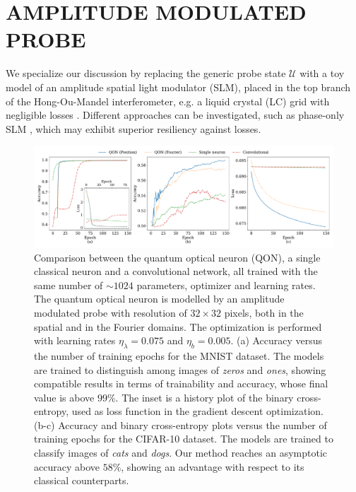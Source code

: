 \documentclass[reprint,
superscriptaddress,
nofootinbib,
aps,
pra,
showkeys
]{revtex4-2}
\newcommand{\U}{\mathcal{U}}
\begin{document}
\section{AMPLITUDE MODULATED PROBE\label{sec:SecIII}}
We specialize our discussion by replacing the generic probe state $\U$ with a toy model of an amplitude spatial light modulator (SLM), placed in the top branch of the Hong-Ou-Mandel interferometer, e.g. a liquid crystal (LC) grid with negligible losses \citep{art:Neff}. Different approaches can be investigated, such as phase-only SLM \citep{art:Zhang}, which may exhibit superior resiliency against losses.
\begin{figure}
	\centering
	\includegraphics[width = 1 \textwidth]{Comparison.pdf}%
	\caption{\label{fig:Training}Comparison between the quantum optical neuron (QON), a single classical neuron and a convolutional network, all trained with the same number of $\sim 1024$ parameters, optimizer and learning rates. The quantum optical neuron is modelled by an amplitude modulated probe with resolution of $32 \times 32$ pixels, both in the spatial and in the Fourier domains. The optimization is performed with learning rates $\eta_\lambda = 0.075$ and $\eta_b = 0.005$. (a) Accuracy versus the number of training epochs for the MNIST dataset. The models are trained to distinguish among images of \emph{zeros} and \emph{ones}, showing compatible results in terms of trainability and accuracy,  whose final value is above $99\%$. The inset is a history plot of the binary cross-entropy, used as loss function in the gradient descent optimization. (b-c) Accuracy and binary cross-entropy plots versus the number of training epochs for the CIFAR-10 dataset. The models are trained to classify images of \emph{cats} and \emph{dogs}. Our method reaches an asymptotic accuracy above $58\%$, showing an advantage with respect to its classical counterparts.}
\end{figure}
\end{document}
